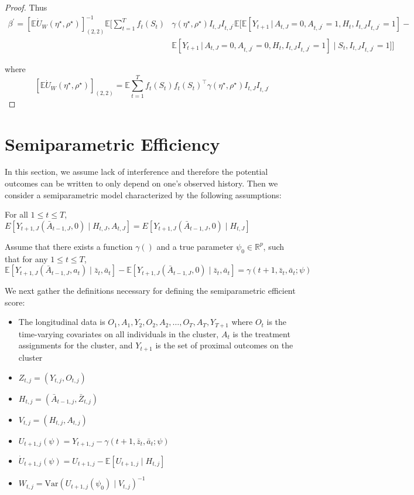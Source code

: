 \documentclass[supplementary, lineno]{biometrika}
\def\E{\mathbb{E}}
\def\given{\, | \,}
\begin{document}
\begin{proof}
Thus
\begin{align}
\label{eq:estimand_beta}
    \beta^\prime =\left[\E \dot U_W(\eta^\star,\rho^\star) \right]_{(2,2)}^{-1} \E \Bigg[\sum_{t=1}^T  f_t (S_t) &\gamma(\eta^\star,\rho^\star) I_{t,J}I_{t,J^\prime}  \E \Big[\E \left[Y_{t+1} \given{A_{t,J}=0,A_{t,J^\prime}=1, H_t ,I_{t,J}I_{t,J^\prime}=1} \right] - \nonumber \\
   &\E \left[Y_{t+1} \given{A_{t,J}=0,A_{t,J^\prime}=0, H_t ,I_{t,J}I_{t,J^\prime}=1} \right] \mid S_t,I_{t,J}I_{t,J^\prime}=1\Big]  \Bigg]
\end{align}

where
\[
\left[\E \dot U_W(\eta^\star,\rho^\star) \right]_{(2,2)} =\E \sum_{t=1}^T  f_t (S_t)f_t (S_t)^\top \gamma(\eta^\star,\rho^\star) I_{t,J}I_{t,J^\prime}
\]
\end{proof}

\section{Semiparametric Efficiency}
\label{app:semipareff}

In this section, we assume lack of interference and therefore the potential outcomes can be written to only depend on one's observed history.  Then we consider a semiparametric model characterized by the following assumptions:
\begin{assumption}
For all $1 \leq t \leq T$, $E[ Y_{t+1,J} (\bar A_{t-1,J}, 0) \mid H_{t,J}, A_{t,J} ] = E[ Y_{t+1,J} (\bar A_{t-1,J}, 0) \mid H_{t,J} ]$
\end{assumption}
\begin{assumption}
Assume that there exists a function $\gamma()$ and a true parameter $\psi_0 \in \mathbb{R}^p$, such that for any $1 \leq t \leq T$,
$$
\mathbb{E} \left[ Y_{t+1,J} (\bar A_{t-1,J}, a_t) \mid \bar z_t, \bar a_t \right] - \mathbb{E} \left[ Y_{t+1,J} (\bar A_{t-1,J}, 0) \mid \bar z_t, \bar a_t \right] = \gamma(t+1, \bar z_t, \bar a_t; \psi)
$$
\end{assumption}
We next gather the definitions necessary for defining the semiparametric efficient score:
\begin{itemize}
\item The longitudinal data is $O_1, A_1, Y_{2}, O_2, A_2, \ldots, O_T, A_T, Y_{T+1}$ where $O_t$ is the time-varying covariates on all individuals in the cluster, $A_t$ is the treatment assignments for the cluster, and $Y_{t+1}$ is the set of proximal outcomes on the cluster
\item $Z_{t,j} = (Y_{t,j}, O_{t,j})$
\item $H_{t,j} = (\bar A_{t-1,j}, \bar Z_{t,j})$
\item $V_{t,j} = (H_{t,j}, A_{t,j})$
\item $U_{t+1,j} (\psi) = Y_{t+1,j} - \gamma(t+1, \bar z_t, \bar a_t; \psi)$
\item $\dot{U}_{t+1,j} (\psi) = U_{t+1,j} - \mathbb{E} \left[ U_{t+1, j} \mid H_{t,j} \right]$
\item $W_{t,j} = \text{Var} \left( U_{t+1,j} (\psi_0) \mid V_{t,j} \right)^{-1}$
\end{itemize}
\end{document}
